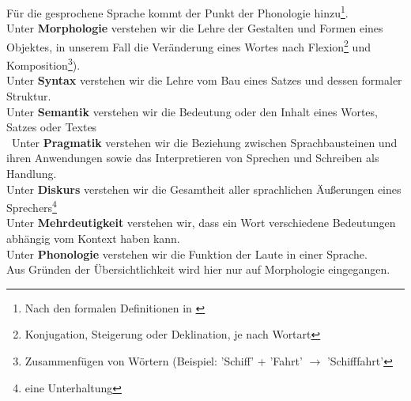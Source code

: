 \documentclass[12pt,twoside]{article}
\theoremstyle{plain}
\theoremstyle{definition}
\theoremstyle{remark}
\begin{document}
Für die gesprochene Sprache kommt der Punkt der Phonologie hinzu\footnote{Nach den formalen Definitionen in \cite{duden}}.\\
Unter \textbf{Morphologie} verstehen wir die Lehre der Gestalten und Formen eines Objektes, in unserem Fall die Veränderung eines Wortes nach Flexion\footnote{Konjugation, Steigerung oder Deklination, je nach Wortart} und Komposition\footnote{Zusammenfügen von Wörtern (Beispiel: 'Schiff' + 'Fahrt' $\longrightarrow$ 'Schifffahrt'}). \\
Unter \textbf{Syntax} verstehen wir die Lehre vom Bau eines Satzes und dessen formaler Struktur.\\
Unter \textbf{Semantik} verstehen wir die Bedeutung oder den Inhalt eines Wortes, Satzes oder Textes\\\
Unter \textbf{Pragmatik} verstehen wir die Beziehung zwischen Sprachbausteinen und ihren Anwendungen sowie das Interpretieren von Sprechen und Schreiben als Handlung.\\
Unter \textbf{Diskurs} verstehen wir die Gesamtheit aller sprachlichen Äußerungen eines Sprechers\footnote{eine Unterhaltung}\\
Unter \textbf{Mehrdeutigkeit} verstehen wir, dass ein Wort verschiedene Bedeutungen abhängig vom Kontext haben kann.\\
Unter \textbf{Phonologie} verstehen wir die Funktion der Laute in einer Sprache.\\
Aus Gründen der Übersichtlichkeit wird hier nur auf Morphologie eingegangen.
\end{document}
